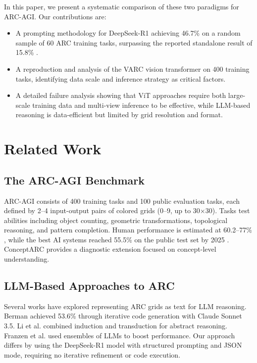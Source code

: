 \documentclass{article}
\begin{document}
In this paper, we present a systematic comparison of these two paradigms for ARC-AGI. Our contributions are:

\begin{itemize}
    \item A prompting methodology for DeepSeek-R1 \cite{deepseek2025r1} achieving 46.7\% on a random sample of 60 ARC training tasks, surpassing the reported standalone result of 15.8\% \cite{deepseek2025r1}.
    \item A reproduction and analysis of the VARC vision transformer on 400 training tasks, identifying data scale and inference strategy as critical factors.
    \item A detailed failure analysis showing that ViT approaches require both large-scale training data and multi-view inference to be effective, while LLM-based reasoning is data-efficient but limited by grid resolution and format.
\end{itemize}

\section{Related Work}

\subsection{The ARC-AGI Benchmark}

ARC-AGI \cite{chollet2019measure,chollet2024arc} consists of 400 training tasks and 100 public evaluation tasks, each defined by 2--4 input-output pairs of colored grids (0--9, up to 30$\times$30). Tasks test abilities including object counting, geometric transformations, topological reasoning, and pattern completion. Human performance is estimated at 60.2--77\% \cite{legris2024harc,legris2025comprehensive}, while the best AI systems reached 55.5\% on the public test set by 2025 \cite{arcprize2025leaderboard}. ConceptARC \cite{moskvichev2023conceptarc} provides a diagnostic extension focused on concept-level understanding.

\subsection{LLM-Based Approaches to ARC}

Several works have explored representing ARC grids as text for LLM reasoning. Berman \cite{bermancomefirst2024,bermansonnet2024,bermanpython2025} achieved 53.6\% through iterative code generation with Claude Sonnet 3.5. Li et al. \cite{li2025combining} combined induction and transduction for abstract reasoning. Franzen et al. \cite{franzen2025product} used ensembles of LLMs to boost performance. Our approach differs by using the DeepSeek-R1 model with structured prompting and JSON mode, requiring no iterative refinement or code execution.
\end{document}
